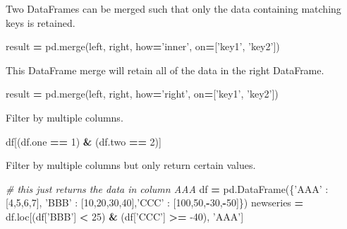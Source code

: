 \documentclass[]{book}
\newenvironment{Shaded}{\begin{snugshade}}{\end{snugshade}}
\newcommand{\CommentTok}[1]{\textcolor[rgb]{0.56,0.35,0.01}{\textit{#1}}}
\newcommand{\DecValTok}[1]{\textcolor[rgb]{0.00,0.00,0.81}{#1}}
\newcommand{\NormalTok}[1]{#1}
\newcommand{\OperatorTok}[1]{\textcolor[rgb]{0.81,0.36,0.00}{\textbf{#1}}}
\newcommand{\StringTok}[1]{\textcolor[rgb]{0.31,0.60,0.02}{#1}}
\begin{document}
Two DataFrames can be merged such that only the data containing matching keys is retained.

\begin{Shaded}
\begin{Highlighting}[]
\NormalTok{result }\OperatorTok{=}\NormalTok{ pd.merge(left, right, how}\OperatorTok{=}\StringTok{'inner'}\NormalTok{, on}\OperatorTok{=}\NormalTok{[}\StringTok{'key1'}\NormalTok{, }\StringTok{'key2'}\NormalTok{])}
\end{Highlighting}
\end{Shaded}

This DataFrame merge will retain all of the data in the right DataFrame.

\begin{Shaded}
\begin{Highlighting}[]
\NormalTok{result }\OperatorTok{=}\NormalTok{ pd.merge(left, right, how}\OperatorTok{=}\StringTok{'right'}\NormalTok{, on}\OperatorTok{=}\NormalTok{[}\StringTok{'key1'}\NormalTok{, }\StringTok{'key2'}\NormalTok{])}
\end{Highlighting}
\end{Shaded}

Filter by multiple columns.

\begin{Shaded}
\begin{Highlighting}[]
\NormalTok{df[(df.one }\OperatorTok{==} \DecValTok{1}\NormalTok{) }\OperatorTok{&}\NormalTok{ (df.two }\OperatorTok{==} \DecValTok{2}\NormalTok{)]}
\end{Highlighting}
\end{Shaded}

Filter by multiple columns but only return certain values.

\begin{Shaded}
\begin{Highlighting}[]
\CommentTok{# this just returns the data in column AAA}
\NormalTok{df }\OperatorTok{=}\NormalTok{ pd.DataFrame(\{}\StringTok{'AAA'}\NormalTok{ : [}\DecValTok{4}\NormalTok{,}\DecValTok{5}\NormalTok{,}\DecValTok{6}\NormalTok{,}\DecValTok{7}\NormalTok{], }\StringTok{'BBB'}\NormalTok{ : [}\DecValTok{10}\NormalTok{,}\DecValTok{20}\NormalTok{,}\DecValTok{30}\NormalTok{,}\DecValTok{40}\NormalTok{],}\StringTok{'CCC'}\NormalTok{ : [}\DecValTok{100}\NormalTok{,}\DecValTok{50}\NormalTok{,}\OperatorTok{-}\DecValTok{30}\NormalTok{,}\OperatorTok{-}\DecValTok{50}\NormalTok{]\})}
\NormalTok{newseries }\OperatorTok{=}\NormalTok{ df.loc[(df[}\StringTok{'BBB'}\NormalTok{] }\OperatorTok{<} \DecValTok{25}\NormalTok{) }\OperatorTok{&}\NormalTok{ (df[}\StringTok{'CCC'}\NormalTok{] }\OperatorTok{>=} \DecValTok{-40}\NormalTok{), }\StringTok{'AAA'}\NormalTok{]}
\end{Highlighting}
\end{Shaded}
\end{document}
